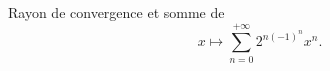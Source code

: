 \begin{enonce}
\begin{exercise}[ID={RMS 122-2 E1257 Autres écoles PSI},subtitle={},tags={}]
Rayon de convergence et somme de
\begin{equation*}
  x\mapsto \sum_{n=0}^{+\infty} 2^{n(-1)^n} x^n.
\end{equation*}
\end{exercise}
\begin{solution}
\end{solution}
\end{enonce}
